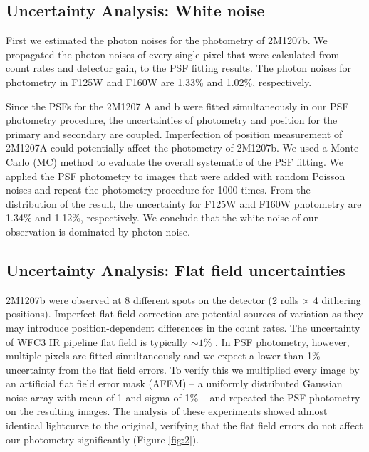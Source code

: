\documentclass[apj]{emulateapj}
\begin{document}
\subsection{Uncertainty Analysis: White noise}
First we estimated the photon noises for the photometry of 2M1207b. We
propagated the photon noises of every single pixel that were
calculated from count rates and detector gain, to the PSF fitting
results. The photon noises for photometry in F125W and F160W are
1.33\% and 1.02\%, respectively.

Since the PSFs for the 2M1207 A and b were fitted simultaneously in our
PSF photometry procedure, the uncertainties of photometry and position
for the primary and secondary are coupled. Imperfection of position
measurement of 2M1207A could potentially affect the photometry of
2M1207b. We used a Monte Carlo (MC) method to
evaluate the overall systematic of the PSF fitting. We applied the
PSF photometry to images that were added with random Poisson noises and
repeat the photometry procedure for 1000 times. From the distribution of the
result, the uncertainty for F125W and F160W photometry are 
1.34\% and 1.12\%, respectively. We conclude that the white noise of
our observation is dominated by photon noise.

\subsection{Uncertainty Analysis: Flat field uncertainties}


2M1207b were observed at 8 different spots on the
detector (2 rolls $\times$ 4 dithering positions). Imperfect flat
field correction are potential sources of variation as they may
introduce position-dependent differences in the count rates. The
uncertainty of WFC3 IR pipeline flat field is typically $\sim 1\%$
\citep{dressel2012wide}.
In PSF photometry, however, multiple pixels are fitted simultaneously
and we expect a lower than 1\% uncertainty from the flat field
errors. To verify this we multiplied every image by an artificial flat
field error mask (AFEM) -- a uniformly distributed Gaussian noise array with
mean of 1 and sigma of 1\% -- and repeated the PSF photometry on the
resulting images.  The analysis of these experiments showed almost
identical lightcurve to the original, verifying that the flat field
errors do not affect our photometry significantly (Figure
\ref{fig:2}).
\end{document}
